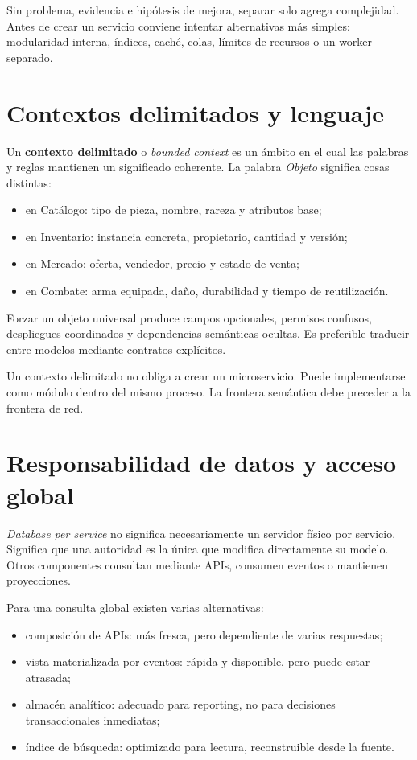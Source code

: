 \documentclass[variant=apuntes,cover=institutional,mode=screen]{ua-engineering-v6-article}
\begin{document}
Sin problema, evidencia e hipótesis de mejora, separar solo agrega complejidad. Antes de crear un servicio conviene intentar alternativas más simples: modularidad interna, índices, caché, colas, límites de recursos o un worker separado.

\section{Contextos delimitados y lenguaje}

Un \textbf{contexto delimitado} o \emph{bounded context} es un ámbito en el cual las palabras y reglas mantienen un significado coherente. La palabra \emph{Objeto} significa cosas distintas:

\begin{itemize}
\item en Catálogo: tipo de pieza, nombre, rareza y atributos base;
\item en Inventario: instancia concreta, propietario, cantidad y versión;
\item en Mercado: oferta, vendedor, precio y estado de venta;
\item en Combate: arma equipada, daño, durabilidad y tiempo de reutilización.
\end{itemize}

Forzar un objeto universal produce campos opcionales, permisos confusos, despliegues coordinados y dependencias semánticas ocultas. Es preferible traducir entre modelos mediante contratos explícitos.

Un contexto delimitado no obliga a crear un microservicio. Puede implementarse como módulo dentro del mismo proceso. La frontera semántica debe preceder a la frontera de red.

\section{Responsabilidad de datos y acceso global}

\emph{Database per service} no significa necesariamente un servidor físico por servicio. Significa que una autoridad es la única que modifica directamente su modelo. Otros componentes consultan mediante APIs, consumen eventos o mantienen proyecciones.

Para una consulta global existen varias alternativas:

\begin{itemize}
\item composición de APIs: más fresca, pero dependiente de varias respuestas;
\item vista materializada por eventos: rápida y disponible, pero puede estar atrasada;
\item almacén analítico: adecuado para reporting, no para decisiones transaccionales inmediatas;
\item índice de búsqueda: optimizado para lectura, reconstruible desde la fuente.
\end{itemize}
\end{document}
